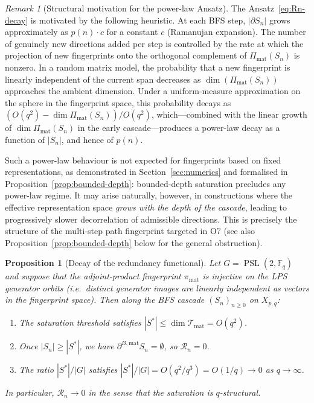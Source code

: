 \documentclass[11pt]{article}
\newtheorem{proposition}[theorem]{Proposition}
\theoremstyle{definition}
\theoremstyle{remark}
\newtheorem{remark}[theorem]{Remark}
\DeclareMathOperator{\PSL}{PSL}
\newcommand{\F}{\mathbb{F}}
\newcommand{\Tmat}{\mathcal{T}_{\mathrm{mat}}}
\newcommand{\Rn}{\mathcal{R}_n}
\begin{document}
    \begin{remark}[Structural motivation for the power-law Ansatz]
      \label{rem:power-law-motivation}
      The Ansatz~\eqref{eq:Rn-decay} is motivated by the following heuristic.
      At each BFS step, $|\partial S_n|$ grows approximately as $p(n) \cdot c$ for a
      constant $c$ (Ramanujan expansion).
      The number of genuinely new directions added per step is controlled by the
      rate at which the projection of new fingerprints onto the orthogonal complement of
      $\Pi_{\mathrm{mat}}(S_n)$ is nonzero.
      In a random matrix model, the probability that a new fingerprint is linearly
      independent of the current span decreases as $\dim(\Pi_{\mathrm{mat}}(S_n))$
      approaches the ambient dimension.
      Under a uniform-measure approximation on the sphere in the fingerprint space,
      this probability decays as $(O(q^2) - \dim\Pi_{\mathrm{mat}}(S_n)) / O(q^2)$,
      which---combined with the linear growth of $\dim \Pi_{\mathrm{mat}}(S_n)$ in the
      early cascade---produces a power-law decay as a function of $|S_n|$, and hence of $p(n)$.

      Such a power-law behaviour is not expected for fingerprints based on fixed representations,
      as demonstrated in Section~\ref{sec:numerics} and formalised in
      Proposition~\ref{prop:bounded-depth}: bounded-depth saturation precludes any power-law
      regime.
      It may arise naturally, however, in constructions where the effective representation space
      \emph{grows with the depth of the cascade}, leading to progressively slower
      decorrelation of admissible directions.
      This is precisely the structure of the multi-step path fingerprint targeted in O7
      (see also Proposition~\ref{prop:bounded-depth} below for the general obstruction).
    \end{remark}

    \begin{proposition}[Decay of the redundancy functional]
      \label{prop:Rn-decay}
      Let $G = \PSL(2, \F_q)$ and suppose that the adjoint-product fingerprint
      $\pi_{\mathrm{mat}}$ is injective on the LPS generator orbits (i.e.\ distinct generator
      images are linearly independent as vectors in the fingerprint space).
      Then along the BFS cascade $(S_n)_{n \geq 0}$ on $X_{p,q}$:
      \begin{enumerate}[label=(\roman*)]
\item The saturation threshold satisfies $|S^*| \leq \dim \Tmat = O(q^2)$.
\item \label{item:Rn-zero}
Once $|S_n| \geq |S^*|$, we have $\partial^{B,\mathrm{mat}} S_n = \emptyset$, so
$\Rn = 0$.
\item \label{item:ratio-decay}
The ratio $|S^*|/|G|$ satisfies
$|S^*|/|G| = O(q^2/q^3) = O(1/q) \to 0$ as $q \to \infty$.
      \end{enumerate}
      In particular, $\Rn \to 0$ in the sense that the saturation is $q$-structural.
    \end{proposition}
\end{document}
